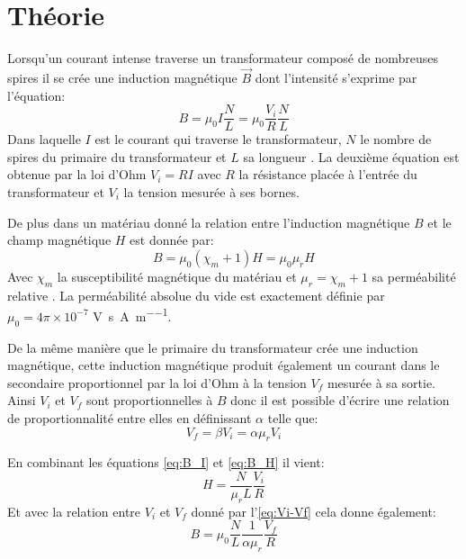 \section{Théorie}

Lorsqu'un courant intense traverse un transformateur composé de nombreuses spires il se crée une induction magnétique \(\vec{B}\) dont l'intensité s'exprime par l'équation:
\begin{equation}
    B = \mu_0 I \frac{N}{L} = \mu_0 \frac{V_i}{R} \frac{N}{L}
    \label{eq:B_I}
\end{equation}
Dans laquelle \(I\) est le courant qui traverse le transformateur, \(N\) le nombre de spires du primaire du transformateur et \(L\) sa longueur \cite{assistant}. La deuxième équation est obtenue par la loi d'Ohm \(V_i = RI\) avec \(R\) la résistance placée à l'entrée du transformateur et \(V_i\) la tension mesurée à ses bornes.

De plus dans un matériau donné la relation entre l'induction magnétique \(B\) et le champ magnétique \(H\) est donnée par:
\begin{equation}
    B = \mu_0 (\chi_m + 1) H = \mu_0 \mu_r H
    \label{eq:B_H}
\end{equation}
Avec \(\chi_m\) la susceptibilité magnétique du matériau et \(\mu_r = \chi_m + 1\) sa perméabilité relative \cite{notice}. La perméabilité absolue du vide est exactement définie par \(\mu_0 = 4\pi \times 10^{-7}\) \si{\volt\second \per\ampere\per\meter}.

De la même manière que le primaire du transformateur crée une induction magnétique, cette induction magnétique produit également un courant dans le secondaire proportionnel par la loi d'Ohm à la tension \(V_f\) mesurée à sa sortie. Ainsi \(V_i\) et \(V_f\) sont proportionnelles à \(B\) donc il est possible d'écrire une relation de proportionnalité entre elles en définissant \(\alpha\) telle que:
\begin{equation}
    V_f = \beta V_i = \alpha \mu_r V_i
    \label{eq:Vi-Vf}
\end{equation}

En combinant les équations \autoref{eq:B_I} et \autoref{eq:B_H} il vient:
\begin{equation}
    H = \frac{N}{\mu_r L} \frac{V_i}{R}
    \label{eq:calibr_H}
\end{equation}
Et avec la relation entre \(V_i\) et \(V_f\) donné par l'\autoref{eq:Vi-Vf} cela donne également:
\begin{equation}
    B = \mu_0 \frac{N}{L} \frac{1}{\alpha \mu_r} \frac{V_f}{R}
    \label{eq:calibr_B}
\end{equation}

